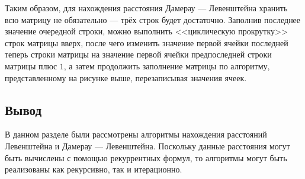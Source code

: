 Таким образом, для нахождения расстояния Дамерау --- Левенштейна хранить всю матрицу не обязательно --- трёх строк будет достаточно.
Заполнив последнее значение очередной строки, можно выполнить <<циклическую прокрутку>> строк матрицы вверх, после чего изменить значение первой ячейки последней теперь строки матрицы на значение первой ячейки предпоследней строки матрицы плюс $1$, а затем продолжить заполнение матрицы по алгоритму, представленному на рисунке выше, перезаписывая значения ячеек.

\subsection*{Вывод}

В данном разделе были рассмотрены алгоритмы нахождения расстояний Левенштейна и Дамерау --- Левенштейна.
Поскольку данные расстояния могут быть вычислены с помощью рекуррентных формул, то алгоритмы могут быть реализованы как рекурсивно, так и итерационно.
